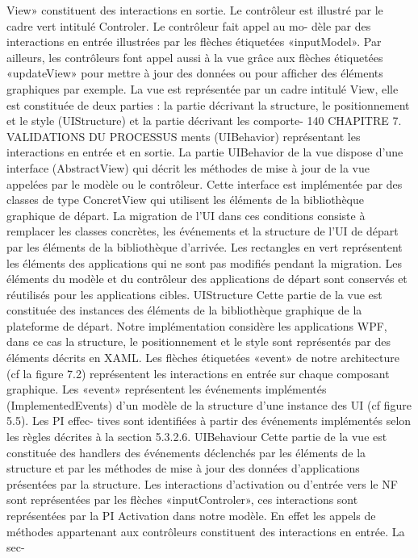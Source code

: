 \documentclass{article}
\begin{document}
View» constituent des interactions en sortie.
Le contrôleur est illustré par le cadre vert intitulé Controler. Le contrôleur fait appel au mo-
dèle par des interactions en entrée illustrées par les ﬂèches étiquetées «inputModel». Par ailleurs, les
contrôleurs font appel aussi à la vue grâce aux ﬂèches étiquetées «updateView» pour mettre à jour des
données ou pour afﬁcher des éléments graphiques par exemple.
La vue est représentée par un cadre intitulé View, elle est constituée de deux parties : la partie
décrivant la structure, le positionnement et le style (UIStructure) et la partie décrivant les comporte-
140
CHAPITRE 7. VALIDATIONS DU PROCESSUS
ments (UIBehavior) représentant les interactions en entrée et en sortie. La partie UIBehavior de la vue
dispose d’une interface (AbstractView) qui décrit les méthodes de mise à jour de la vue appelées par
le modèle ou le contrôleur. Cette interface est implémentée par des classes de type ConcretView qui
utilisent les éléments de la bibliothèque graphique de départ. La migration de l’UI dans ces conditions
consiste à remplacer les classes concrètes, les événements et la structure de l’UI de départ par les
éléments de la bibliothèque d’arrivée.
Les rectangles en vert représentent les éléments des applications qui ne sont pas modiﬁés pendant
la migration. Les éléments du modèle et du contrôleur des applications de départ sont conservés et
réutilisés pour les applications cibles.
UIStructure
Cette partie de la vue est constituée des instances des éléments de la bibliothèque
graphique de la plateforme de départ. Notre implémentation considère les applications WPF, dans ce
cas la structure, le positionnement et le style sont représentés par des éléments décrits en XAML.
Les ﬂèches étiquetées «event» de notre architecture (cf la ﬁgure 7.2) représentent les interactions
en entrée sur chaque composant graphique. Les «event» représentent les événements implémentés
(ImplementedEvents) d’un modèle de la structure d’une instance des UI (cf ﬁgure 5.5). Les PI effec-
tives sont identiﬁées à partir des événements implémentés selon les règles décrites à la section 5.3.2.6.
UIBehaviour
Cette partie de la vue est constituée des handlers des événements déclenchés par les
éléments de la structure et par les méthodes de mise à jour des données d’applications présentées
par la structure. Les interactions d’activation ou d’entrée vers le NF sont représentées par les ﬂèches
«inputControler», ces interactions sont représentées par la PI Activation dans notre modèle. En effet
les appels de méthodes appartenant aux contrôleurs constituent des interactions en entrée. La sec-
\end{document}
